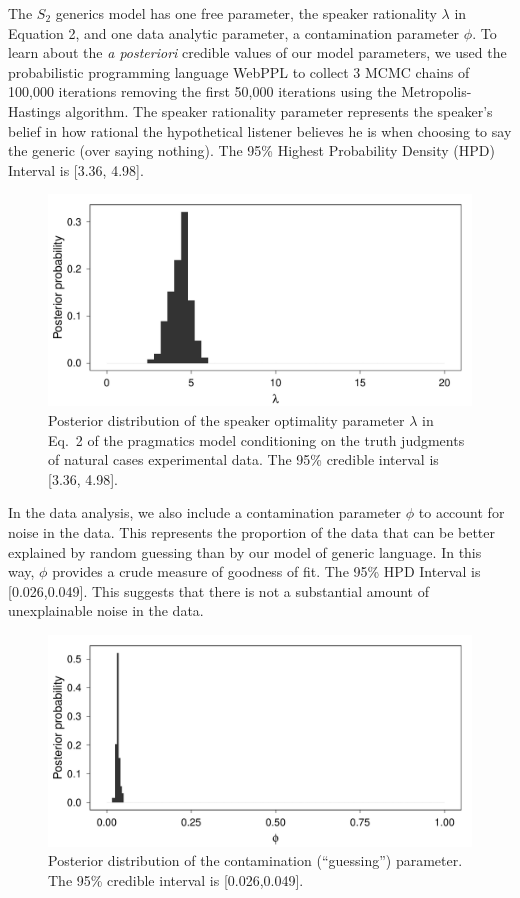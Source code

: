 \documentclass[10pt,letterpaper]{article}
\begin{document}
The $S_2$ generics model has one free parameter, the speaker rationality $\lambda$ in Equation 2, and one data analytic parameter, a contamination parameter $\phi$.
To learn about the \emph{a posteriori} credible values of our model parameters, we used the probabilistic programming language WebPPL \cite{dippl} to collect 3 MCMC chains of 100,000 iterations removing the first 50,000 iterations using the Metropolis-Hastings algorithm. 
The speaker rationality parameter represents the speaker's belief in how rational the hypothetical listener believes he is when choosing to say the generic (over saying nothing). 
The 95\% Highest Probability Density (HPD) Interval is [3.36, 4.98].

\begin{figure}
\centering
    \includegraphics[width=0.8\columnwidth]{naturalGenerics-speakerOptimality.pdf}
    \caption{Posterior distribution of the speaker optimality parameter $\lambda$ in Eq.~2 of the pragmatics model conditioning on the truth judgments of natural cases experimental data. The 95\% credible interval is [3.36, 4.98].}
  \label{fig:lambda1}
\end{figure}

In the data analysis, we also include a contamination parameter $\phi$ to account for noise in the data.  
This represents the proportion of the data that can be better explained by random guessing than by our model of generic language.
In this way, $\phi$ provides a crude measure of goodness of fit. 
The 95\% HPD Interval is [0.026,0.049]. 
This suggests that there is not a substantial amount of unexplainable noise in the data. 

\begin{figure}
\centering
    \includegraphics[width=0.8\columnwidth]{naturalGenerics-phi.pdf}
    \caption{Posterior distribution of the contamination (``guessing'') parameter. The 95\% credible interval is [0.026,0.049].}
  \label{fig:phi1}
\end{figure}
\end{document}
